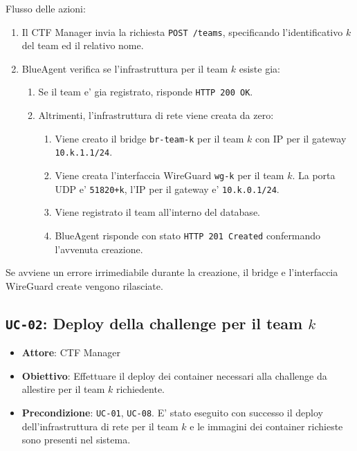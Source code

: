 Flusso delle azioni:

\begin{enumerate}
\def\labelenumi{\arabic{enumi}.}
\tightlist
\item
  Il CTF Manager invia la richiesta
  \passthrough{\lstinline!POST /teams!}, specificando l'identificativo
  \(k\) del team ed il relativo nome.
\item
  BlueAgent verifica se l'infrastruttura per il team \(k\) esiste gia:

  \begin{enumerate}
  \def\labelenumii{\arabic{enumii}.}
  \tightlist
  \item
    Se il team e' gia registrato, risponde
    \passthrough{\lstinline!HTTP 200 OK!}.
  \item
    Altrimenti, l'infrastruttura di rete viene creata da zero:

    \begin{enumerate}
    \def\labelenumiii{\arabic{enumiii}.}
    \tightlist
    \item
      Viene creato il bridge \passthrough{\lstinline!br-team-k!} per il
      team \(k\) con IP per il gateway
      \passthrough{\lstinline!10.k.1.1/24!}.
    \item
      Viene creata l'interfaccia WireGuard
      \passthrough{\lstinline!wg-k!} per il team \(k\). La porta UDP e'
      \passthrough{\lstinline!51820+k!}, l'IP per il gateway e'
      \passthrough{\lstinline!10.k.0.1/24!}.
    \item
      Viene registrato il team all'interno del database.
    \item
      BlueAgent risponde con stato
      \passthrough{\lstinline!HTTP 201 Created!} confermando l'avvenuta
      creazione.
    \end{enumerate}
  \end{enumerate}
\end{enumerate}

Se avviene un errore irrimediabile durante la creazione, il bridge e
l'interfaccia WireGuard create vengono rilasciate.

\subsection{\texorpdfstring{\texttt{UC-02}: Deploy della challenge per
il team
\(k\)}{UC-02: Deploy della challenge per il team k}}\label{uc-02-deploy-della-challenge-per-il-team-k}

\begin{itemize}
\tightlist
\item
  \textbf{Attore}: CTF Manager
\item
  \textbf{Obiettivo}: Effettuare il deploy dei container necessari alla
  challenge da allestire per il team \(k\) richiedente.
\item
  \textbf{Precondizione}: \passthrough{\lstinline!UC-01!},
  \passthrough{\lstinline!UC-08!}. E' stato eseguito con successo il
  deploy dell'infrastruttura di rete per il team \(k\) e le immagini dei
  container richieste sono presenti nel sistema.
\end{itemize}


